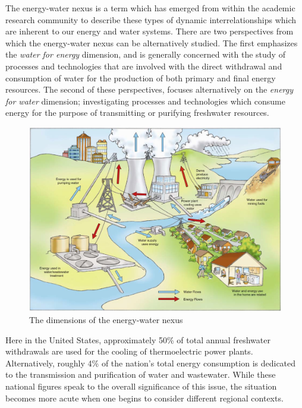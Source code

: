 The energy-water nexus is a term which has emerged from within the academic research community to describe these types of dynamic interrelationships which are inherent to our energy and water systems. There are two perspectives from which the energy-water nexus can be alternatively studied. The first emphasizes the \textit{water for energy} dimension, and is generally concerned with the study of processes and technologies that are involved with the direct withdrawal and consumption of water for the production of both primary and final energy resources. The second of these perspectives, focuses alternatively on the \textit{energy for water} dimension; investigating processes and technologies which consume energy for the purpose of transmitting or purifying freshwater resources. 
    
     \begin{figure}[!h]
       \centering
       \includegraphics[width=5.5in]{figures/energy-water-nexus-dimensions.png}
       \caption[Dimensions of the Energy-Water Nexus]{The dimensions of the energy-water nexus \cite{Pate2007}}
       \label{fig:energy-water-dimensions}
     \end{figure}
    
Here in the United States, approximately 50\% of total annual freshwater withdrawals are used for the cooling of thermoelectric power plants. Alternatively, roughly 4\% of the nation's total energy consumption is dedicated to the transmission and purification of water and wastewater. While these national figures speak to the overall significance of this issue, the situation becomes more acute when one begins to consider different regional contexts. 
    
